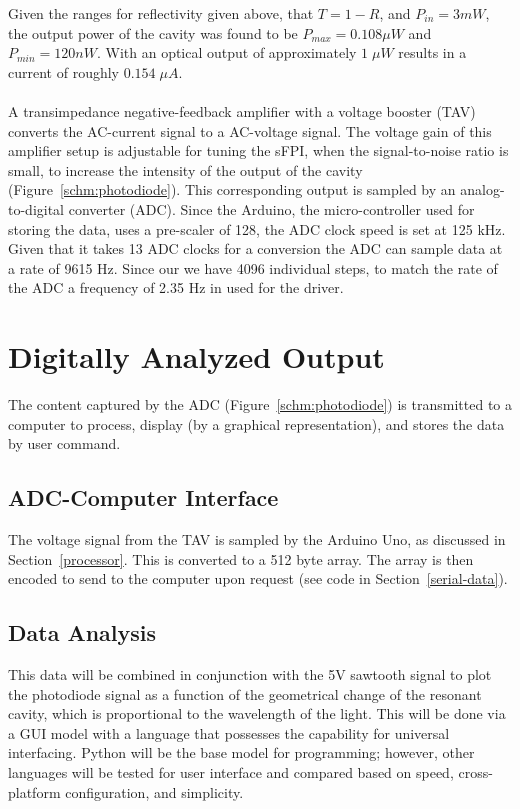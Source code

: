 \documentclass[12pt,journal]{IEEEtran}
\begin{document}
Given the ranges for reflectivity given above, that $T = 1-R$, and $P_{in} = 3 mW$, the output power of the cavity was found to be $P_{max} = 0.108 \mu W$ and $P_{min} = 120 nW$. With an optical output of approximately $1\;\mu W$ results in a current of roughly $0.154\;\mu A$.  
\\\\
A transimpedance negative-feedback amplifier with a voltage booster (TAV) converts the AC-current signal to a AC-voltage signal. The voltage gain of this amplifier setup is adjustable for tuning the sFPI, when the signal-to-noise ratio is small, to increase the intensity of the output of the cavity (Figure~\ref{schm:photodiode}). This corresponding output is sampled by an analog-to-digital converter (ADC). Since the Arduino, the micro-controller used for storing the data, uses a pre-scaler of 128, the ADC clock speed is set at 125 kHz. Given that it takes 13 ADC clocks for a conversion the ADC can sample data at a rate of 9615 Hz. Since our we have 4096 individual steps, to match the rate of the ADC a frequency of 2.35 Hz in used for the driver.    

\section{Digitally Analyzed Output}\label{digital-output}
The content captured by the ADC (Figure~\ref{schm:photodiode}) is transmitted to a computer to process, display (by a graphical representation), and stores the data by user command.  

\subsection{ADC-Computer Interface}
The voltage signal from the TAV is sampled by the Arduino Uno, as discussed in Section~\ref{processor}. This is converted to a 512 byte array. The array is then encoded to send to the computer upon request (see code in Section~\ref{serial-data}).

\subsection{Data Analysis}

This data will be combined in conjunction with the 5V sawtooth signal to plot the photodiode signal as a function of the geometrical change of the resonant cavity, which is proportional to the wavelength of the light. This will be done via a GUI model with a language that possesses the capability for universal interfacing. Python will be the base model for programming; however, other languages will be tested for user interface and compared based on speed, cross-platform configuration, and simplicity.
\end{document}
